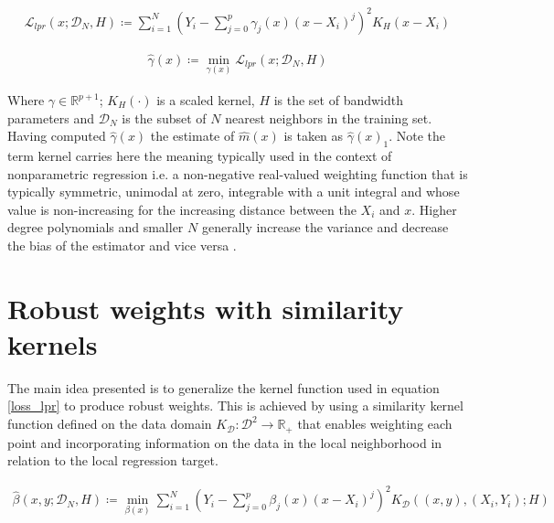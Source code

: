 \documentclass[preprint,1p,times]{elsarticle}
\begin{document}
\begin{align}
\mathcal{L}_{lpr}(x; \mathcal{D}_N , H) \coloneqq \sum_{i=1}^N \left(  Y_i - \sum_{j=0}^p \gamma_j (x) (x - X_i)^j \right)^2 K_H(x - X_i)
\label{loss_lpr}
\end{align}


\begin{align}
\hat{\gamma}(x) \coloneqq \min_{\gamma(x)} \mathcal{L}_{lpr}(x; \mathcal{D}_N,H)
\label{beta_loss_x}
\end{align}

Where $\gamma \in \mathbb{R}^{p+1}$; $K_H(\cdot)$ is a scaled kernel, $H$ is the set of bandwidth parameters and $\mathcal{D}_N$ is the subset of $N$ nearest neighbors in the training set. Having computed $\hat{\gamma}(x)$ the estimate of $\hat{m}(x)$ is taken as $\hat{\gamma}(x)_1$. Note the term kernel carries here the meaning typically used in the context of nonparametric regression i.e. a non-negative real-valued weighting function that is typically symmetric, unimodal at zero, integrable with a unit integral and whose value is non-increasing for the increasing distance between the $X_i$ and $x$. Higher degree polynomials and smaller $N$ generally increase the variance and decrease the bias of the estimator and vice versa \citep{Avery2010LiteratureRF}.

\section{Robust weights with similarity kernels}
\label{S:Robust weights with similarity kernels}
The main idea presented is to generalize the kernel function used in equation \eqref{loss_lpr} to produce robust weights. This is achieved by using a similarity kernel function defined on the data domain $K_{\mathcal{D}}:\mathcal{D}^2 \rightarrow \mathbb{R}_+$ that enables weighting each point and incorporating information on the data in the local neighborhood in relation to the local regression target. 

\begin{align}
\hat{\beta}(x,y ; \mathcal{D}_N, H ) \coloneqq \min_{\beta(x)} \sum_{i=1}^N \left(  Y_i - \sum_{j=0}^p \beta_j (x) (x - X_i)^j \right)^2 K_{\mathcal{D}} \left((x,y),(X_i, Y_i); H \right)
\label{beta_loss_d}
\end{align}
\end{document}
